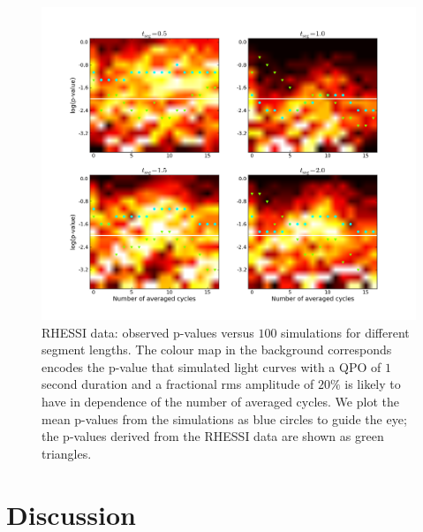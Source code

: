 \documentclass{emulateapj}
\begin{document}
\begin{figure}[htbp]
\begin{center}
\includegraphics[width=\textwidth]{1806_rhessi_somesignals_pvalues.png}
\caption{RHESSI data: observed p-values versus $100$ simulations for different segment lengths. The colour map in the background corresponds encodes the p-value that simulated light curves with a QPO of $1$ second duration and a fractional rms amplitude of $20\%$ is likely to have in dependence of the number of averaged cycles. We plot the mean p-values from the simulations as blue circles to guide the eye; the p-values derived from the RHESSI data are shown as green triangles.}
\label{fig:rhessi_sims3_pvalues}
\end{center}
\end{figure}




\section{Discussion}
\label{sec:discussion}



\end{document}
